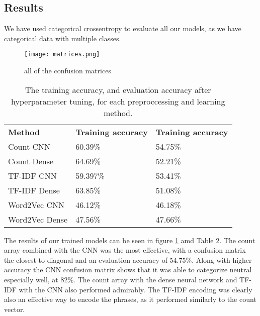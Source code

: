 \documentclass{article}
\begin{document}
\subsection*{Results}
We have used categorical crossentropy to evaluate all our models, as we have categorical data with multiple classes\cite{gómez}.
\begin{figure}[!ht]
    \centering
    \texttt{[image: matrices.png]}
    \caption{ all of the confusion matrices}
    \label{fig:matrices}
\end{figure}
\begin{table}[!ht]
\centering
\begin{tabular}{lll}
\textbf{Method} & \textbf{Training accuracy} & \textbf{Training accuracy} \\
Count CNN       & 60.39\%                    & 54.75\%                       \\
Count Dense     & 64.69\%                    & 52.21\%                       \\
TF-IDF CNN      & 59.397\%                   & 53.41\%                       \\
TF-IDF Dense    & 63.85\%                    & 51.08\%                       \\
Word2Vec CNN    & 46.12\%                    & 46.18\%                       \\
Word2Vec Dense  & 47.56\%                    & 47.66\%
\end{tabular}
\label{table:results}
\caption{The training accuracy, and evaluation accuracy after hyperparameter tuning, for each preproccessing and learning method.}
\end{table}


The results of our trained models can be seen in figure \ref{fig:matrices} amd Table 2. The count array combined with the CNN was the most effective, with a confusion matrix the closest to diagonal and an evaluation accuracy of 54.75\%. Along with higher accuracy the CNN confusion matrix shows that it was able to categorize neutral especially well, at 82\%. The count array with the dense neural network and TF-IDF with the CNN also performed admirably. The TF-IDF encoding was clearly also an effective way to encode the phrases, as it performed similarly to the count vector.
\end{document}
